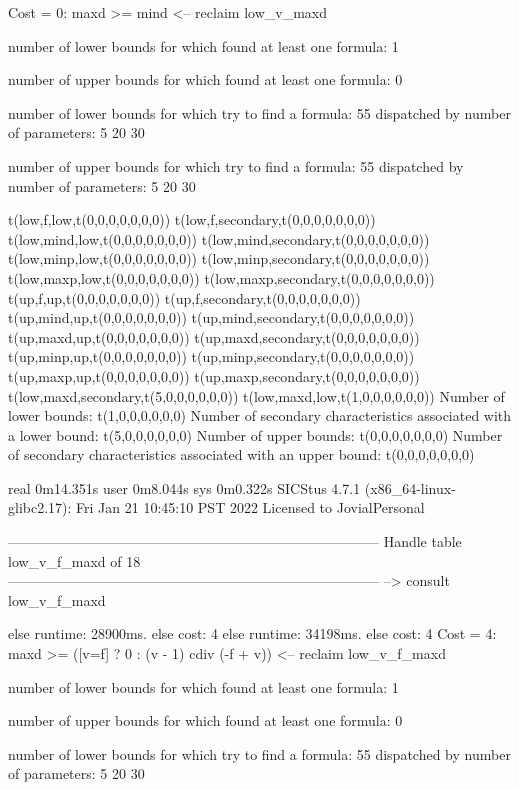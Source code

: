 Cost =  0:  maxd >= mind
<-- reclaim low_v_maxd

number of lower bounds for which found at least one formula: 1

number of upper bounds for which found at least one formula: 0

number of lower bounds for which try to find a formula: 55
dispatched by number of parameters: 5  20  30

number of upper bounds for which try to find a formula: 55
dispatched by number of parameters: 5  20  30

t(low,f,low,t(0,0,0,0,0,0,0))
t(low,f,secondary,t(0,0,0,0,0,0,0))
t(low,mind,low,t(0,0,0,0,0,0,0))
t(low,mind,secondary,t(0,0,0,0,0,0,0))
t(low,minp,low,t(0,0,0,0,0,0,0))
t(low,minp,secondary,t(0,0,0,0,0,0,0))
t(low,maxp,low,t(0,0,0,0,0,0,0))
t(low,maxp,secondary,t(0,0,0,0,0,0,0))
t(up,f,up,t(0,0,0,0,0,0,0))
t(up,f,secondary,t(0,0,0,0,0,0,0))
t(up,mind,up,t(0,0,0,0,0,0,0))
t(up,mind,secondary,t(0,0,0,0,0,0,0))
t(up,maxd,up,t(0,0,0,0,0,0,0))
t(up,maxd,secondary,t(0,0,0,0,0,0,0))
t(up,minp,up,t(0,0,0,0,0,0,0))
t(up,minp,secondary,t(0,0,0,0,0,0,0))
t(up,maxp,up,t(0,0,0,0,0,0,0))
t(up,maxp,secondary,t(0,0,0,0,0,0,0))
t(low,maxd,secondary,t(5,0,0,0,0,0,0))
t(low,maxd,low,t(1,0,0,0,0,0,0))
Number of lower bounds:                                             t(1,0,0,0,0,0,0)
Number of secondary characteristics associated with a lower bound:  t(5,0,0,0,0,0,0)
Number of upper bounds:                                             t(0,0,0,0,0,0,0)
Number of secondary characteristics associated with an upper bound: t(0,0,0,0,0,0,0)

real	0m14.351s
user	0m8.044s
sys	0m0.322s
SICStus 4.7.1 (x86_64-linux-glibc2.17): Fri Jan 21 10:45:10 PST 2022
Licensed to JovialPersonal


--------------------------------------------------------------------------------
Handle table low_v_f_maxd of 18
--------------------------------------------------------------------------------
--> consult low_v_f_maxd

else runtime: 28900ms. else cost: 4
else runtime: 34198ms. else cost: 4
Cost =  4:  maxd >= ([v=f] ? 0 : (v - 1) cdiv (-f + v)) %
<-- reclaim low_v_f_maxd

number of lower bounds for which found at least one formula: 1

number of upper bounds for which found at least one formula: 0

number of lower bounds for which try to find a formula: 55
dispatched by number of parameters: 5  20  30

